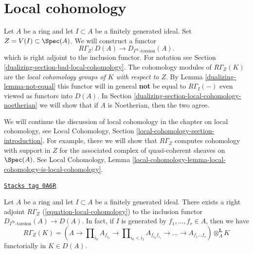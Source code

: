 \section{Local cohomology}
\label{dualizing-section-local-cohomology}
Let $A$ be a ring and let $I \subset A$ be a finitely generated ideal.
Set $Z = V(I) \subset \Spec(A)$. We will construct a functor
\begin{equation}
\label{equation-local-cohomology}
R\Gamma_Z : D(A) \longrightarrow D_{I^\infty\text{-torsion}}(A).
\end{equation}
which is right adjoint to the inclusion functor. For notation
see Section \ref{dualizing-section-bad-local-cohomology}. The cohomology
modules of $R\Gamma_Z(K)$ are the {\it local cohomology groups
of $K$ with respect to $Z$}.
By Lemma \ref{dualizing-lemma-not-equal} this functor will in general {\bf not} be
equal to $R\Gamma_I( - )$ even viewed as functors into $D(A)$.
In Section \ref{dualizing-section-local-cohomology-noetherian}
we will show that if $A$ is Noetherian, then the two agree.

\medskip\noindent
We will continue the discussion of local cohomology in
the chapter on local cohomology, see
Local Cohomology, Section \ref{local-cohomology-section-introduction}.
For example, there we will show that $R\Gamma_Z$ computes cohomology
with support in $Z$ for the associated complex of quasi-coherent sheaves
on $\Spec(A)$. See Local Cohomology, Lemma
\ref{local-cohomology-lemma-local-cohomology-is-local-cohomology}.


\begin{lemma}
\label{dualizing-lemma-local-cohomology-adjoint}
\href{https://stacks.math.columbia.edu/tag/0A6R}{\texttt{Stacks tag 0A6R}}

Let $A$ be a ring and let $I \subset A$ be a finitely generated ideal.
There exists a right adjoint $R\Gamma_Z$ (\ref{equation-local-cohomology})
to the inclusion functor $D_{I^\infty\text{-torsion}}(A) \to D(A)$.
In fact, if $I$ is generated by $f_1, \ldots, f_r \in A$, then we have
$$
R\Gamma_Z(K) =
(A \to \prod\nolimits_{i_0} A_{f_{i_0}} \to
\prod\nolimits_{i_0 < i_1} A_{f_{i_0}f_{i_1}}
\to \ldots \to A_{f_1\ldots f_r}) \otimes_A^\mathbf{L} K
$$
functorially in $K \in D(A)$.
\end{lemma}

